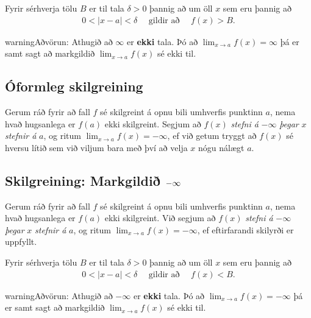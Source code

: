 \documentclass[a4paper,10pt,icelandic]{sphinxmanual}
\begin{document}
Fyrir sérhverja tölu \(B\) er til tala \(\delta>0\) þannig
að um öll \(x\) sem eru þannig að
\begin{equation*}
\begin{split}0 < |x-a| <\delta \quad  \text{ gildir að } \quad f(x) > B.\end{split}
\end{equation*}
\begin{notice}{warning}{Aðvörun:}
Athugið að \(\infty\) er \textbf{ekki} tala. Þó að
\(\lim_{x\rightarrow a} f(x)=\infty\) þá er samt sagt að markgildið
\(\lim_{x\rightarrow a} f(x)\) sé ekki til.
\end{notice}


\subsection{Óformleg skilgreining}
\label{kafli02:id9}
Gerum ráð fyrir að fall \(f\) sé skilgreint á opnu bili umhverfis
punktinn \(a\), nema hvað hugsanlega er \(f(a)\) ekki
skilgreint. Segjum að \(f(x)\) \emph{stefni á} \(-\infty\) \emph{þegar}
\(x\) \emph{stefnir á} \(a\), og ritum
\(\lim_{x\rightarrow a} f(x)=-\infty\), ef við getum tryggt að
\(f(x)\) sé hversu lítið sem við viljum bara með því að velja
\(x\) nógu nálægt \(a\).


\subsection{Skilgreining: Markgildið \protect\(-\infty\protect\)}
\label{kafli02:id10}
Gerum ráð fyrir að fall \(f\) sé skilgreint á opnu bili umhverfis
punktinn \(a\), nema hvað hugsanlega er \(f(a)\) ekki
skilgreint. Við segjum að \(f(x)\) \emph{stefni á} \(-\infty\)
\emph{þegar} \(x\) \emph{stefnir á} \(a\), og ritum
\(\lim_{x\rightarrow a} f(x)=-\infty\), ef eftirfarandi skilyrði er
uppfyllt.

Fyrir sérhverja tölu \(B\) er til tala \(\delta>0\) þannig
að um öll \(x\) sem eru þannig að
\begin{equation*}
\begin{split}0 < |x-a| < \delta \quad \text{ gildir að } \quad f(x)<B.\end{split}
\end{equation*}
\begin{notice}{warning}{Aðvörun:}
Athugið að \(-\infty\) er \textbf{ekki} tala. Þó að
\(\lim_{x\rightarrow a} f(x)=-\infty\) þá er samt sagt að markgildið
\(\lim_{x\rightarrow a} f(x)\) sé ekki til.
\end{notice}
\end{document}
